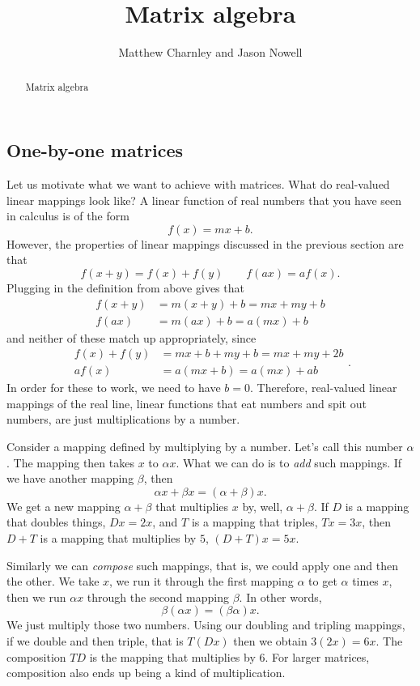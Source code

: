 \documentclass{ximera}
\title{Matrix algebra}
\author{Matthew Charnley and Jason Nowell}
\begin{document}
\begin{abstract}
    Matrix algebra
\end{abstract}
\maketitle


\label{matalg:section}


\subsection{One-by-one matrices}

Let us motivate what we want to achieve with matrices. What do real-valued linear mappings look like? A linear function of real numbers that you have seen in calculus is of the form
\[ 
    f(x) = mx + b. 
\] 
However, the properties of linear mappings discussed in the previous section are that
\[ 
    f(x+y) = f(x) + f(y) \qquad f(a x) = a f(x). 
\] 
Plugging in the definition from above gives that
\[ 
    \begin{split}
        f(x+y) &= m(x+y) + b = mx + my + b \\
        f(ax) &= m(ax) + b = a(mx) + b
    \end{split}
\]
and neither of these match up appropriately, since
\[
    \begin{split}
        f(x) + f(y) &= mx + b + my + b = mx + my + 2b \\
        af(x) &= a(mx + b) = a(mx) + ab
    \end{split}.
\]
In order for these to work, we need to have $b=0$. Therefore, real-valued linear mappings of the real line, linear functions that eat numbers and spit out numbers, are just multiplications by a number.  

Consider a mapping defined by multiplying by a number.  Let's call this number $\alpha$.   The mapping then takes $x$ to $\alpha x$.  What we can do is to \emph{add} such mappings. If we have another mapping $\beta$, then
\begin{equation*}
    \alpha x + \beta x = (\alpha + \beta) x .
\end{equation*}
We get a new mapping $\alpha+\beta$ that multiplies $x$ by, well, $\alpha+\beta$.  If $D$ is a mapping that doubles things, $Dx = 2x$, and $T$ is a mapping that triples, $Tx = 3x$, then $D+T$ is a mapping that multiplies by $5$, $(D+T)x = 5x$.

Similarly we can \emph{compose} such mappings, that is, we could apply one and then the other.  We take $x$, we run it through the first mapping $\alpha$ to get $\alpha$ times $x$, then we run $\alpha x$ through the second mapping $\beta$.  In other words,
\begin{equation*}
    \beta ( \alpha x ) = (\beta \alpha) x .
\end{equation*}
We just multiply those two numbers.  Using our doubling and tripling mappings, if we double and then triple, that is $T(Dx)$ then we obtain $3(2x) = 6x$.  The composition $TD$ is the mapping that multiplies by $6$.  For larger matrices, composition also ends up being a kind of multiplication.
\end{document}
